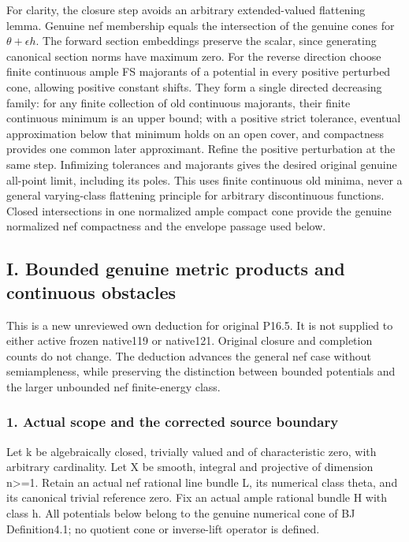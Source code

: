 \documentclass[
  10pt,
]{article}
\begin{document}
For clarity, the closure step avoids an arbitrary extended-valued
flattening lemma. Genuine nef membership equals the intersection of the
genuine cones for \(\theta+\epsilon h\). The forward section embeddings
preserve the scalar, since generating canonical section norms have
maximum zero. For the reverse direction choose finite continuous ample
FS majorants of a potential in every positive perturbed cone, allowing
positive constant shifts. They form a single directed decreasing family:
for any finite collection of old continuous majorants, their finite
continuous minimum is an upper bound; with a positive strict tolerance,
eventual approximation below that minimum holds on an open cover, and
compactness provides one common later approximant. Refine the positive
perturbation at the same step. Infimizing tolerances and majorants gives
the desired original genuine all-point limit, including its poles. This
uses finite continuous old minima, never a general varying-class
flattening principle for arbitrary discontinuous functions. Closed
intersections in one normalized ample compact cone provide the genuine
normalized nef compactness and the envelope passage used below.

\subsection{I. Bounded genuine metric products and continuous
obstacles}\label{i.-bounded-genuine-metric-products-and-continuous-obstacles}

This is a new unreviewed own deduction for original P16.5. It is not
supplied to either active frozen native119 or native121. Original
closure and completion counts do not change. The deduction advances the
general nef case without semiampleness, while preserving the distinction
between bounded potentials and the larger unbounded nef finite-energy
class.

\subsubsection{1. Actual scope and the corrected source
boundary}\label{actual-scope-and-the-corrected-source-boundary}

Let k be algebraically closed, trivially valued and of characteristic
zero, with arbitrary cardinality. Let X be smooth, integral and
projective of dimension n\textgreater=1. Retain an actual nef rational
line bundle L, its numerical class theta, and its canonical trivial
reference zero. Fix an actual ample rational bundle H with class h. All
potentials below belong to the genuine numerical cone of BJ
Definition4.1; no quotient cone or inverse-lift operator is defined.
\end{document}
